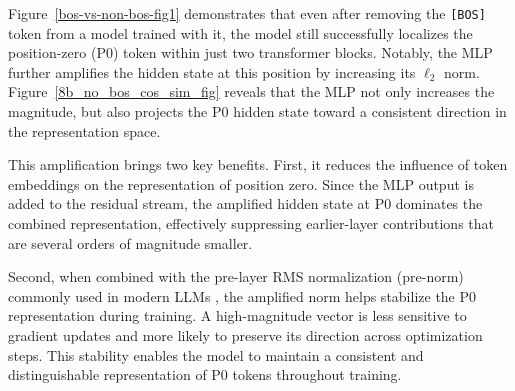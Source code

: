 \documentclass[]{template}
\theoremstyle{plain}
\theoremstyle{definition}
\theoremstyle{remark}
\begin{document}
Figure~\ref{bos-vs-non-bos-fig1} demonstrates that even after removing the \texttt{[BOS]} token from a model trained with it, the model still successfully localizes the position-zero (P0) token within just two transformer blocks. Notably, the MLP further amplifies the hidden state at this position by increasing its $\ell_2$ norm. Figure~\ref{8b_no_bos_cos_sim_fig} reveals that the MLP not only increases the magnitude, but also projects the P0 hidden state toward a consistent direction in the representation space.

This amplification brings two key benefits. First, it reduces the influence of token embeddings on the representation of position zero. Since the MLP output is added to the residual stream, the amplified hidden state at P0 dominates the combined representation, effectively suppressing earlier-layer contributions that are several orders of magnitude smaller.

Second, when combined with the pre-layer RMS normalization (pre-norm) commonly used in modern LLMs \citep{zhang2019rootmeansquarelayer, ba2016layernormalization}, the amplified norm helps stabilize the P0 representation during training. A high-magnitude vector is less sensitive to gradient updates and more likely to preserve its direction across optimization steps. This stability enables the model to maintain a consistent and distinguishable representation of P0 tokens throughout training.
\end{document}

